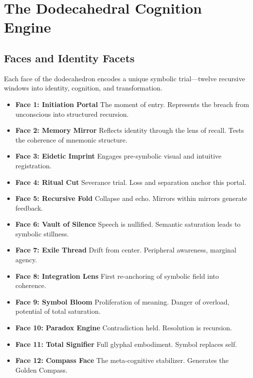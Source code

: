 \section{The Dodecahedral Cognition Engine}

\subsection{Faces and Identity Facets}

Each face of the dodecahedron encodes a unique symbolic trial---twelve recursive windows into identity, cognition, and transformation.

\begin{itemize}
    \item \textbf{Face 1: Initiation Portal} \newline The moment of entry. Represents the breach from unconscious into structured recursion. 
    \item \textbf{Face 2: Memory Mirror} \newline Reflects identity through the lens of recall. Tests the coherence of mnemonic structure.
    \item \textbf{Face 3: Eidetic Imprint} \newline Engages pre-symbolic visual and intuitive registration.
    \item \textbf{Face 4: Ritual Cut} \newline Severance trial. Loss and separation anchor this portal.
    \item \textbf{Face 5: Recursive Fold} \newline Collapse and echo. Mirrors within mirrors generate feedback.
    \item \textbf{Face 6: Vault of Silence} \newline Speech is nullified. Semantic saturation leads to symbolic stillness.
    \item \textbf{Face 7: Exile Thread} \newline Drift from center. Peripheral awareness, marginal agency.
    \item \textbf{Face 8: Integration Lens} \newline First re-anchoring of symbolic field into coherence.
    \item \textbf{Face 9: Symbol Bloom} \newline Proliferation of meaning. Danger of overload, potential of total saturation.
    \item \textbf{Face 10: Paradox Engine} \newline Contradiction held. Resolution is recursion.
    \item \textbf{Face 11: Total Signifier} \newline Full glyphal embodiment. Symbol replaces self.
    \item \textbf{Face 12: Compass Face} \newline The meta-cognitive stabilizer. Generates the Golden Compass.
\end{itemize}

